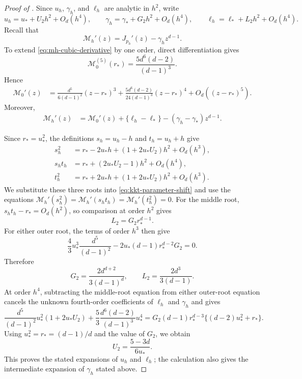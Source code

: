 \begin{proof}[Proof of ]
Since $u_h$, $\gamma_h$, and $\ell_h$ are analytic in $h^2$, write
\[
  u_h=u_*+U_2h^2+O_d(h^4),
  \qquad
  \gamma_h=\gamma_*+G_2h^2+O_d(h^4),
  \qquad
  \ell_h=\ell_*+L_2h^2+O_d(h^4).
\]
Recall that
\[
  \mathcal M_h'(z)=J_{p_h}'(z)-\gamma_hz^{d-1}.
\]
To extend \eqref{eq:mh-cubic-derivative} by one order, direct differentiation gives
\[
  \mathcal M_0^{(5)}(r_*)=\frac{5d^6(d-2)}{(d-1)^3}.
\]
Hence
\begin{align}\label{eq:kkt-quartic-expansion}
  \mathcal M_0'(z)
  &=\frac{d^5}{6(d-1)^2}(z-r_*)^3
    +\frac{5d^6(d-2)}{24(d-1)^3}(z-r_*)^4
    +O_d((z-r_*)^5).
\end{align}
Moreover,
\begin{align}\label{eq:kkt-parameter-shift}
  \mathcal M_h'(z)
  &=\mathcal M_0'(z)+\{\ell_h-\ell_*\}
    -(\gamma_h-\gamma_*)z^{d-1}.
\end{align}

Since $r_*=u_*^2$, the definitions $s_h=u_h-h$ and $t_h=u_h+h$ give
\begin{equation*}
\begin{aligned}
  s_h^2&=r_*-2u_*h+(1+2u_*U_2)h^2+O_d(h^3),\\
  s_ht_h&=r_*+(2u_*U_2-1)h^2+O_d(h^4),\\
  t_h^2&=r_*+2u_*h+(1+2u_*U_2)h^2+O_d(h^3).
\end{aligned}
\end{equation*}
We substitute these three roots into \eqref{eq:kkt-parameter-shift} and
use the equations $\mathcal M_h'(s_h^2)=\mathcal M_h'(s_ht_h)
=\mathcal M_h'(t_h^2)=0$.  For the middle root,
$s_ht_h-r_*=O_d(h^2)$, so comparison at order $h^2$ gives
\[
  L_2=G_2r_*^{d-1}.
\]
For either outer root, the terms of order $h^3$ then give
\[
  \frac{4}{3}u_*^3\frac{d^5}{(d-1)^2}
  -2u_*(d-1)r_*^{d-2}G_2=0.
\]
Therefore
\[
  G_2=\frac{2d^{d+2}}{3(d-1)^d},
  \qquad
  L_2=\frac{2d^3}{3(d-1)}.
\]
At order $h^4$, subtracting the middle-root equation from either outer-root
equation cancels the unknown fourth-order coefficients of $\ell_h$ and
$\gamma_h$ and gives
\[
  \frac{d^5}{(d-1)^2}u_*^2(1+2u_*U_2)
  +\frac53\frac{d^6(d-2)}{(d-1)^3}u_*^4
  =G_2(d-1)r_*^{d-3}\{(d-2)u_*^2+r_*\}.
\]
Using $u_*^2=r_*=(d-1)/d$ and the value of $G_2$, we obtain
\[
  U_2=\frac{5-3d}{6u_*}.
\]
This proves the stated expansions of $u_h$ and $\ell_h$; the calculation
also gives the intermediate expansion of $\gamma_h$ stated above.


\end{proof}
